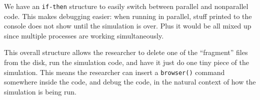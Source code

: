 \documentclass[
]{book}
\newenvironment{Shaded}{\begin{snugshade}}{\end{snugshade}}
\newcommand{\AttributeTok}[1]{\textcolor[rgb]{0.13,0.29,0.53}{#1}}
\newcommand{\CommentTok}[1]{\textcolor[rgb]{0.56,0.35,0.01}{\textit{#1}}}
\newcommand{\ConstantTok}[1]{\textcolor[rgb]{0.56,0.35,0.01}{#1}}
\newcommand{\ControlFlowTok}[1]{\textcolor[rgb]{0.13,0.29,0.53}{\textbf{#1}}}
\newcommand{\DecValTok}[1]{\textcolor[rgb]{0.00,0.00,0.81}{#1}}
\newcommand{\FunctionTok}[1]{\textcolor[rgb]{0.13,0.29,0.53}{\textbf{#1}}}
\newcommand{\NormalTok}[1]{#1}
\newcommand{\OtherTok}[1]{\textcolor[rgb]{0.56,0.35,0.01}{#1}}
\newcommand{\SpecialCharTok}[1]{\textcolor[rgb]{0.81,0.36,0.00}{\textbf{#1}}}
\begin{document}
We have an \texttt{if-then} structure to easily switch between parallel and nonparallel code.
This makes debugging easier: when running in parallel, stuff printed to the console does not show until the simulation is over.
Plus it would be all mixed up since multiple processes are working simultaneously.

This overall structure allows the researcher to delete one of the ``fragment'' files from the disk, run the simulation code, and have it just do one tiny piece of the simulation.
This means the researcher can insert a \texttt{browser()} command somewhere inside the code, and debug the code, in the natural context of how the simulation is being run.

\begin{Shaded}
\end{Shaded}
\end{document}
